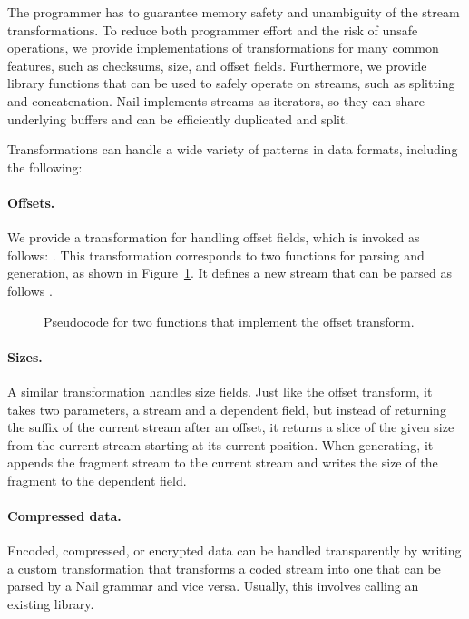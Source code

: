 The programmer has to guarantee memory safety and unambiguity of the stream transformations. To
reduce both programmer effort and the risk of unsafe operations, we provide implementations of
transformations for many common features, such as checksums, size, and offset fields. Furthermore,
we provide library functions that can be used to safely operate on streams, such as splitting and
concatenation. Nail implements streams as iterators, so they can share underlying buffers and can be
efficiently duplicated and split.

Transformations can handle a wide variety of patterns in data formats, including the following: 
\paragraph{Offsets.}
We provide a transformation for handling offset fields, which is invoked as follows:
. 
This transformation corresponds to two functions for parsing and
generation, as shown in Figure~\ref{fig:xform-sig}. It defines a new stream  that can
be parsed as follows .

\begin{figure}[h]
\smaller[0.5]

\caption{Pseudocode for two functions that implement the offset transform.}
\label{fig:xform-sig}
\end{figure}


\paragraph{Sizes.}
A similar transformation handles size fields. Just like the offset transform, it takes two parameters, a
stream and a dependent field, but instead of returning the suffix of the current stream after an
offset, it returns a slice of the given size from the current stream starting at its current
position. When generating, it appends the fragment stream to the current stream and writes the size
of the fragment to the dependent field.

\paragraph{Compressed data.}
Encoded, compressed, or encrypted data can be handled transparently by writing a custom
transformation that transforms a coded stream into one that can be parsed by a Nail grammar and vice
versa. Usually, this involves calling an existing library.

